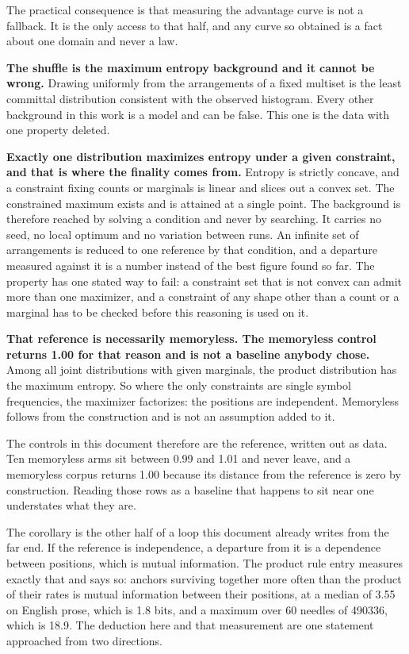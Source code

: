 The practical consequence is that measuring the advantage curve is not a fallback. It is the only access to that half, and any curve so obtained is a fact about one domain and never a law.

\textbf{The shuffle is the maximum entropy background and it cannot be wrong.} Drawing uniformly from the arrangements of a fixed multiset is the least committal distribution consistent with the observed histogram. Every other background in this work is a model and can be false. This one is the data with one property deleted.

\textbf{Exactly one distribution maximizes entropy under a given constraint, and that is where the finality comes from.} Entropy is strictly concave, and a constraint fixing counts or marginals is linear and slices out a convex set. The constrained maximum exists and is attained at a single point. The background is therefore reached by solving a condition and never by searching. It carries no seed, no local optimum and no variation between runs. An infinite set of arrangements is reduced to one reference by that condition, and a departure measured against it is a number instead of the best figure found so far. The property has one stated way to fail: a constraint set that is not convex can admit more than one maximizer, and a constraint of any shape other than a count or a marginal has to be checked before this reasoning is used on it.

\textbf{That reference is necessarily memoryless. The memoryless control returns 1.00 for that reason and is not a baseline anybody chose.} Among all joint distributions with given marginals, the product distribution has the maximum entropy. So where the only constraints are single symbol frequencies, the maximizer factorizes: the positions are independent. Memoryless follows from the construction and is not an assumption added to it.

The controls in this document therefore are the reference, written out as data. Ten memoryless arms sit between 0.99 and 1.01 and never leave, and a memoryless corpus returns 1.00 because its distance from the reference is zero by construction. Reading those rows as a baseline that happens to sit near one understates what they are.

The corollary is the other half of a loop this document already writes from the far end. If the reference is independence, a departure from it is a dependence between positions, which is mutual information. The product rule entry measures exactly that and says so: anchors surviving together more often than the product of their rates is mutual information between their positions, at a median of 3.55 on English prose, which is 1.8 bits, and a maximum over 60 needles of 490336, which is 18.9. The deduction here and that measurement are one statement approached from two directions.

